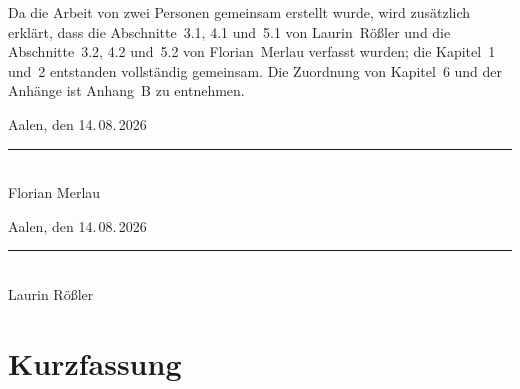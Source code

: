 \documentclass[
  a4paper,
  11pt,
  twoside,
  BCOR=8mm,           %
  headings=big,
  numbers=noenddot,
  listof=totoc,       %
  captions=tableheading,
]{scrreprt}
\begin{document}
\bigskip
Da die Arbeit von zwei Personen gemeinsam erstellt wurde, wird zusätzlich
erklärt, dass die Abschnitte~3.1, 4.1 und~5.1 von Laurin~Rößler und die
Abschnitte~3.2, 4.2 und~5.2 von Florian~Merlau verfasst wurden; die
Kapitel~1 und~2 entstanden vollständig gemeinsam. Die
Zuordnung von Kapitel~6 und der Anhänge ist Anhang~B zu entnehmen.

\vspace{2.5cm}

\begin{minipage}[t]{0.45\textwidth}
Aalen, den 14.\,08.\,2026\\[1.4cm]
\rule{0.8\textwidth}{0.4pt}\\
Florian Merlau
\end{minipage}
\hfill
\begin{minipage}[t]{0.45\textwidth}
Aalen, den 14.\,08.\,2026\\[1.4cm]
\rule{0.8\textwidth}{0.4pt}\\
Laurin Rößler
\end{minipage}

\clearpage

\chapter*{Kurzfassung}
\thispagestyle{empty}
\end{document}
